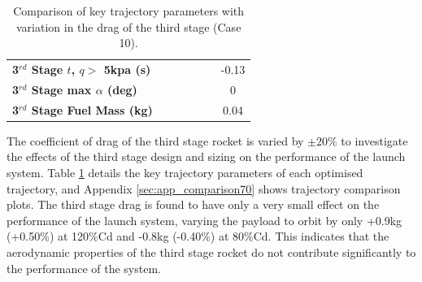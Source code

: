 \begin{table}[ht]
\begin{tabular}{l c c c c c c}
		\textbf{3$^{rd}$ Stage $t$, $q >$ 5kpa (s)}
		& \thirdqOverFiveCdThreeEightyNoReturn
		& \thirdqOverFiveCdThreeNinetyNoReturn
		& \thirdqOverFiveCdThreeStandardNoReturn
		& \thirdqOverFiveCdThreeOneHundredTenNoReturn
		& \thirdqOverFiveCdThreeOneHundredTwentyNoReturn
		&-0.13
		\\
		\textbf{3$^{rd}$ Stage max $\alpha$ (deg)}
		& \thirdmaxAoACdThreeEightyNoReturn
		& \thirdmaxAoACdThreeNinetyNoReturn
		& \thirdmaxAoACdThreeStandardNoReturn
		& \thirdmaxAoACdThreeOneHundredTenNoReturn
		& \thirdmaxAoACdThreeOneHundredTwentyNoReturn
		&0
		\\
		\textbf{3$^{rd}$ Stage Fuel Mass (kg)}
		& \thirdmFuelCdThreeEightyNoReturn
		& \thirdmFuelCdThreeNinetyNoReturn
		& \thirdmFuelCdThreeStandardNoReturn
		& \thirdmFuelCdThreeOneHundredTenNoReturn
		& \thirdmFuelCdThreeOneHundredTwentyNoReturn
		&0.04
		\\
		\hline 
	\end{tabular} 
	\caption{Comparison of key trajectory parameters with variation in the drag of the third stage (Case 10).}
	\label{tab:comparison70}
	
\end{table}

The coefficient of drag of the third stage rocket is varied by $\pm20\%$ to investigate the effects of the third stage design and sizing on the performance of the launch system. Table \ref{tab:comparison70} details the key trajectory parameters of each optimised trajectory, and Appendix \ref{sec:app_comparison70} shows trajectory comparison plots. The third stage drag is found to have only a very small effect on the performance of the launch system, varying the payload to orbit by only +0.9kg (+0.50\%) at 120\%Cd and -0.8kg (-0.40\%) at 80\%Cd. This indicates that the aerodynamic properties of the third stage rocket do not contribute significantly to the performance of the system. 

